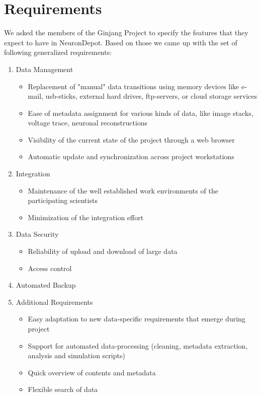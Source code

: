 \documentclass{frontiersSCNS} %
\begin{document}
\section{Requirements}
We asked the members of the Ginjang Project to specify the features that they
expect to have in  NeuronDepot. Based on those we came up with the set of
following generalized requirements:
\begin{enumerate}
\item Data Management
    \begin{itemize}
    \item Replacement of "manual" data transitions using memory devices like
    e-mail, usb-sticks, external hard drives, ftp-servers, or cloud storage
    services
    \item Ease of metadata assignment for various kinds of data, like image stacks,
    voltage trace, neuronal reconstructions
    \item Visibility of  the current state of the project through a web browser
    \item Automatic update and synchronization across project workstations
    \end{itemize}
\item Integration
    \begin{itemize}
    \item Maintenance of the well established work environments of the participating scientists
    \item Minimization of the integration effort
    \end{itemize}
\item Data Security
    \begin{itemize}
    \item Reliability of upload and download of large data
    \item Access control
    \end{itemize}
\item Automated Backup
\item Additional Requirements
    \begin{itemize}
    \item Easy adaptation to new data-specific requirements that emerge during project
    \item Support for automated data-processing (cleaning, metadata extraction,
    analysis and simulation scripts)
    \item Quick overview of contents and metadata
    \item Flexible search of data
    \end{itemize}
\end{enumerate}
\end{document}
